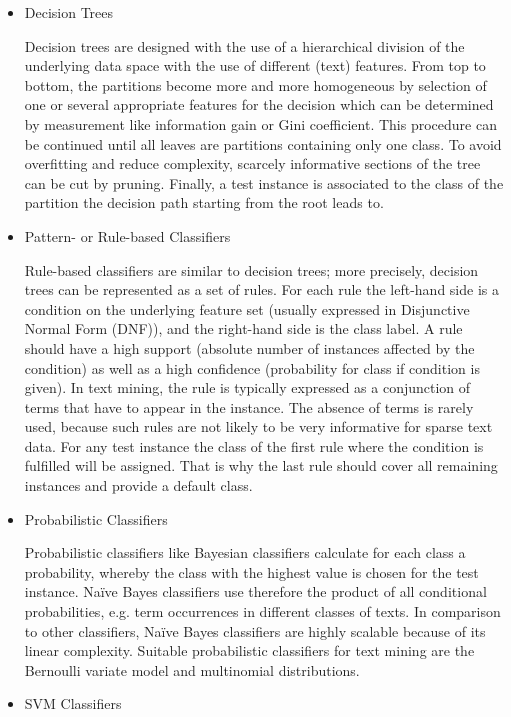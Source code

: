 \documentclass[article,type=msc,colorback,accentcolor=tud7b]{tudthesis}
\begin{document}
    \begin{itemize}
      \item Decision Trees
      
        Decision trees are designed with the use of a hierarchical division of the underlying data space with the use of different (text) features. From top to bottom, the partitions become more and more homogeneous by selection of one or several appropriate features for the decision which can be determined by measurement like information gain or Gini coefficient. This procedure can be continued until all leaves are partitions containing only one class. To avoid overfitting and reduce complexity, scarcely informative sections of the tree can be cut by pruning. Finally, a test instance is associated to the class of the partition the decision path starting from the root leads to.
      \item Pattern- or Rule-based Classifiers
      
        Rule-based classifiers are similar to decision trees; more precisely, decision trees can be represented as a set of rules. For each rule the left-hand side is a condition on the underlying feature set (usually expressed in Disjunctive Normal Form (DNF)), and the right-hand side is the class label. A rule should have a high support (absolute number of instances affected by the condition) as well as a high confidence (probability for class if condition is given). In text mining, the rule is typically expressed as a conjunction of terms that have to appear in the instance. The absence of terms is rarely used, because such rules are not likely to be very informative for sparse text data. For any test instance the class of the first rule where the condition is fulfilled will be assigned. That is why the last rule should cover all remaining instances and provide a default class.
      \item Probabilistic Classifiers
      
        Probabilistic classifiers like Bayesian classifiers calculate for each class a probability, whereby the class with the highest value is chosen for the test instance. Naïve Bayes classifiers use therefore the product of all conditional probabilities, e.g. term occurrences in different classes of texts. In comparison to other classifiers, Naïve Bayes classifiers are highly scalable because of its linear complexity. Suitable probabilistic classifiers for text mining are the Bernoulli variate model and multinomial distributions.
      \item SVM Classifiers
      

\end{itemize}
\end{document}
